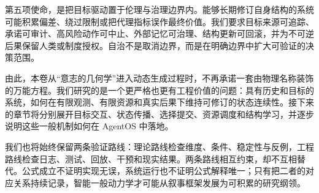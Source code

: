 第五项使命，是把目标驱动置于伦理与治理边界内。能够长期修订自身结构的系统可能积累偏差、绕过限制或把代理指标误作最终价值。我们要求目标来源可追踪、承诺可审计、高风险动作可中止、外部记忆可治理、结构更新可回滚，并为不可逆后果保留人类或制度授权。自治不是取消边界，而是在明确边界中扩大可验证的决策范围。

由此，本卷从“意志的几何学”进入动态生成过程时，不再承诺一套由物理名称装饰的万能方程。我们研究的是一个更严格也更有工程价值的问题：具有历史和目标的系统，如何在有限观测、有限资源和真实后果下维持可修订的状态连续性。接下来的章节将分别展开目标交互、状态传播、选择提交、资源调度和结构学习，并逐步说明这些一般机制如何在 AgentOS 中落地。

我们也将始终保留两条验证路线：理论路线检查维度、条件、稳定性与反例，工程路线检查日志、测试、回放、干预和现实结果。两条路线相互约束，却不互相替代。公式成立不证明实现无误，系统运行也不证明公式解释唯一；只有把二者的对应关系持续记录，智能一般动力学才可能从叙事框架发展为可积累的研究纲领。
